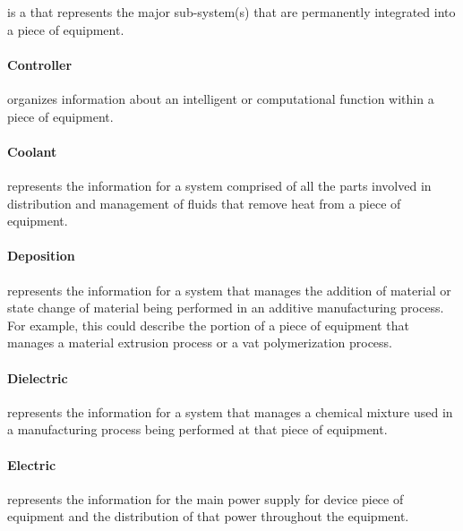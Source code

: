  is a  that represents the major sub-system(s) that are permanently integrated into a piece of equipment.


\paragraph{Controller}\mbox{}
\label{sec:Controller}


 organizes information about an intelligent or computational function within a piece of equipment.


\paragraph{Coolant}\mbox{}
\label{sec:Coolant}


 represents the information for a system comprised of all the parts involved in distribution and management of fluids that remove heat from a piece of equipment.


\paragraph{Deposition}\mbox{}
\label{sec:Deposition}


 represents the information for a system that manages the addition of material or state change of material being performed in an additive manufacturing process.  For example, this could describe the portion of a piece of equipment that manages a material extrusion process or a vat polymerization process.


\paragraph{Dielectric}\mbox{}
\label{sec:Dielectric}


 represents the information for a system that manages a chemical mixture used in a manufacturing process being performed at that piece of equipment.


\paragraph{Electric}\mbox{}
\label{sec:Electric}


 represents the information for the main power supply for device piece of equipment and the distribution of that power throughout the equipment.


